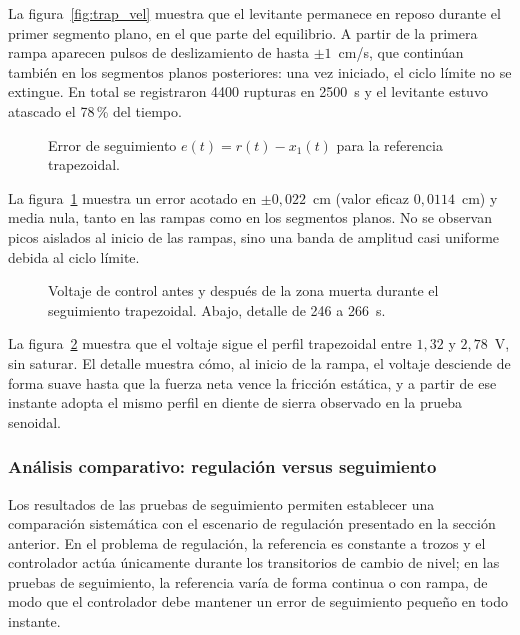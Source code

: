 La figura~\ref{fig:trap_vel} muestra que el levitante permanece en reposo durante el primer segmento plano, en el que parte del equilibrio. A partir de la primera rampa aparecen pulsos de deslizamiento de hasta $\pm 1$~cm/s, que continúan también en los segmentos planos posteriores: una vez iniciado, el ciclo límite no se extingue. En total se registraron 4400 rupturas en 2500~s y el levitante estuvo atascado el 78\,\% del tiempo.

\FloatBarrier

\begin{figure}[ht]
    \centering
    
    \caption[Seguimiento trapezoidal: error]{Error de seguimiento $e(t)=r(t)-x_1(t)$ para la referencia trapezoidal.}
    \label{fig:trap_error}
\end{figure}

La figura~\ref{fig:trap_error} muestra un error acotado en $\pm 0{,}022$~cm (valor eficaz $0{,}0114$~cm) y media nula, tanto en las rampas como en los segmentos planos. No se observan picos aislados al inicio de las rampas, sino una banda de amplitud casi uniforme debida al ciclo límite.

\FloatBarrier

\begin{figure}[ht]
    \centering
    
    \caption[Seguimiento trapezoidal: señal de control]{Voltaje de control antes y después de la zona muerta durante el seguimiento trapezoidal. Abajo, detalle de 246 a 266~s.}
    \label{fig:trap_ctrl}
\end{figure}

La figura~\ref{fig:trap_ctrl} muestra que el voltaje sigue el perfil trapezoidal entre $1{,}32$ y $2{,}78$~V, sin saturar. El detalle muestra cómo, al inicio de la rampa, el voltaje desciende de forma suave hasta que la fuerza neta vence la fricción estática, y a partir de ese instante adopta el mismo perfil en diente de sierra observado en la prueba senoidal.

\FloatBarrier

\subsubsection{Análisis comparativo: regulación versus seguimiento}

Los resultados de las pruebas de seguimiento permiten establecer una comparación sistemática
con el escenario de regulación presentado en la sección anterior.
En el problema de regulación, la referencia es constante a trozos y el controlador actúa
únicamente durante los transitorios de cambio de nivel; en las pruebas de seguimiento,
la referencia varía de forma continua o con rampa, de modo que el controlador debe mantener
un error de seguimiento pequeño en todo instante.


